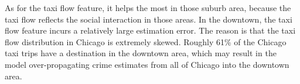 As for the taxi flow feature, it helps the most in those suburb area, because the taxi flow reflects the social interaction in those areas. In the downtown, the taxi flow feature incurs a relatively large estimation error. The reason is that the taxi flow distribution in Chicago is extremely skewed. Roughly 61\% of the Chicago taxi trips have a destination in the downtown area, which may result in the model over-propagating crime estimates from all of Chicago into the downtown area.








